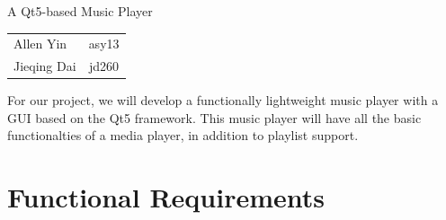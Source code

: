\documentclass[12pt]{article}
\begin{document}
\begin{center}
    {\Large A Qt5-based Music Player} 

\vspace*{20pt}
\begin{tabular}{lc}
Allen Yin& asy13 \\
Jieqing Dai & jd260 \\
\end{tabular}
\end{center}

For our project, we will develop a functionally lightweight music player with a GUI based on the Qt5 framework. This music player will have all the basic functionalties of a media player, in addition to playlist support.


\section{Functional Requirements}
\end{document}
